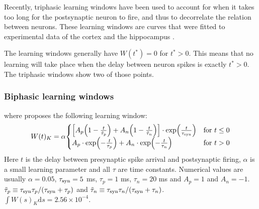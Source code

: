 Recently, triphasic learning windows have been used to account for when it takes too long for the postsynaptic neuron to fire, and thus to decorrelate the relation between neurons. These learning windows are curves that were fitted to experimental data of the cortex and the hippocampus \cite{ChrolCannon2014}.

The learning windows generally have $W(t^{\ast}) = 0$ for $t^{\ast} > 0$. This means that no learning will take place when the delay between neuron spikes is exactly $t^{\ast} > 0$. The triphasic windows show two of those points.

\subsubsection{Biphasic learning windows}
where \cite{Kempter1999} proposes the following learning window:
\begin{align}
W(t)_K = \alpha
\begin{cases}
\left[A_{p}\left(1-\frac{t}{\tilde{\tau}_{p}}\right)+A_{n}\left(1-\frac{t}{\tilde{\tau}_{n}}\right)\right] \cdot \exp \left( \frac{t}{\tau_{\rm syn}} \right) & \text{for } t \leq 0 \\
A_{p} \cdot \exp \left(-\frac{t}{\tau_{p}}\right) + A_{n} \cdot \exp \left(-\frac{t}{\tau_{n}} \right) & \text{for } t > 0
\end{cases} \label{eq:learningwindowKempter1999}
\end{align}
Here $t$ is the delay between presynaptic spike arrival and postsynaptic firing, $\alpha$ is a small learning parameter and all $\tau$ are time constants. Numerical values are usually  $\alpha = 0.05$, $\tau_{\rm syn} = 5$ ms, $\tau_{p} = 1$ ms, $\tau_{n} = 20$ ms and $A_p = 1$ and $A_{n} = -1$. $\tilde{\tau}_{p} \equiv \tau_{\rm syn} \tau_{p} / (\tau_{\rm syn} + \tau_{p})$ and $\tilde{\tau}_{n} \equiv \tau_{\rm syn} \tau_{n} / (\tau_{\rm syn} + \tau_{n})$. \\
$\int W(s)_K \mathrm{d}s = 2.56 \times 10^{-4}$.

